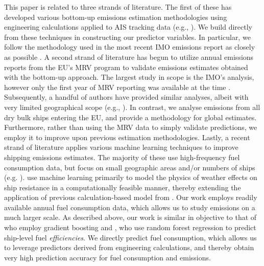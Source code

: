 
This paper is related to three strands of literature. The first of these has developed various bottom-up emissions estimation methodologies using engineering calculations applied to \ac{AIS} tracking data (e.g., \cite{jalkanen2009modelling,olmer2017greenhouse,moreno2019comparative,tvete2020modelling}). We build directly from these techniques in constructing our predictor variables. In particular, we follow the methodology used in the most recent \ac{IMO} emissions report as closely as possible \parencite{faber2020fourth}. A second strand of literature has begun to utilize annual emissions reports from the \ac{EU}'s \ac{MRV} program to validate emissions estimates obtained with the bottom-up approach. The largest study in scope is the \ac{IMO}'s analysis, however only the first year of \ac{MRV} reporting was available at the time \parencite{faber2020fourth}. Subsequently, a handful of authors have provided similar analyses, albeit with very limited geographical scope (e.g., \cite{doundoulakis2022comparative,mannarini2020eu,hensel2020green,wu2023evaluation}). In contrast, we analyse emissions from all dry bulk ships entering the \ac{EU}, and provide a methodology for global estimates. Furthermore, rather than using the \ac{MRV} data to simply validate predictions, we employ it to improve upon previous estimation methodologies. Lastly, a recent strand of literature applies various machine learning techniques to improve shipping emissions estimates. The majority of these use high-frequency fuel consumption data, but focus on small geographic areas and/or numbers of ships (e.g. \cite{ren2022container,wang2023ship,hu2019prediction,jebsen2020estimating,monisha2023step}). \textcite{guo2022combined} use machine learning primarily to model the physics of weather effects on ship resistance in a computationally feasible manner, thereby extending the application of previous calculation-based model from \textcite{tvete2020modelling}. Our work employs readily available annual fuel consumption data, which allows us to study emissions on a much larger scale. As described above, our work is similar in objective to that of \textcite{yan2023analysis} who employ gradient boosting and \textcite{clarke2023co2}, who use random forest regression to predict ship-level fuel \textit{efficiencies}. We directly predict fuel consumption, which allows us to leverage predictors derived from engineering calculations, and thereby obtain very high prediction accuracy for fuel consumption and emissions.
